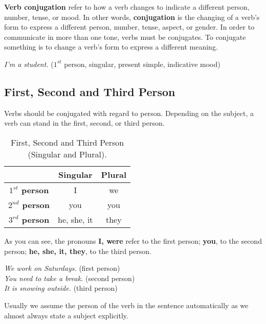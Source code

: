 \documentclass[hidelinks,10pt,a4paper]{article}
\begin{document}
\textbf{Verb conjugation} refer to how a verb changes to indicate a different person, number, tense, or mood. In other words, \textbf{conjugation} is the changing of a verb's form to express a different person, number, tense, aspect, or gender. In order to communicate in more than one tone, verbs must be conjugates. To conjugate something is to change a verb's form to express a different meaning.

\begin{center}
	\textit{I'm a student.} ($1^{st}$ person, singular, present simple, indicative mood)
\end{center}

\subsection{First, Second and Third Person}
Verbs should be conjugated with regard to person. Depending on the subject, a verb can stand in the first, second, or third person.

\begin{table}[h]
	\begin{center}
	\begin{tabular}{|c|c|c|}
		\hline
		  & \textbf{Singular} & \textbf{Plural} \\ \hline
		\textbf{$1^{st}$ person} & I & we \\ \hline
		\textbf{$2^{nd}$ person} & you & you \\ \hline
		\textbf{$3^{rd}$ person} & he, she, it & they \\ \hline
	\end{tabular}
\end{center}
	\caption{\label{tab:vrbcjg1}First, Second and Third Person (Singular and Plural).}
\end{table}

\newpage
As you can see, the pronouns \textbf{I, were} refer to the first person; \textbf{you}, to the second person; \textbf{he, she, it, they}, to the third person.

\begin{center}
	\textit{We work on Saturdays.} (first person) \\
	\textit{You need to take a break.} (second person) \\
	\textit{It is snowing outside.} (third person)
\end{center}

Usually we assume the person of the verb in the sentence automatically as we almost always state a subject explicitly.
\end{document}
